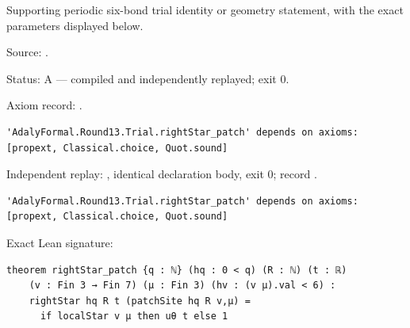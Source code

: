 \begin{theorem}[bp-399]
\label{bp-399}
\leanok
Supporting periodic six-bond trial identity or geometry statement, with the exact parameters displayed below.

\par Source: \texttt{}.
\par Status: A — compiled and independently replayed; exit 0.
\par Axiom record: \texttt{}.
\begin{verbatim}
'AdalyFormal.Round13.Trial.rightStar_patch' depends on axioms: [propext, Classical.choice, Quot.sound]
\end{verbatim}
\par Independent replay: \texttt{}, identical declaration body, exit 0; record \texttt{}.
\begin{verbatim}
'AdalyFormal.Round13.Trial.rightStar_patch' depends on axioms: [propext, Classical.choice, Quot.sound]
\end{verbatim}
\par Exact Lean signature:
\begin{verbatim}
theorem rightStar_patch {q : ℕ} (hq : 0 < q) (R : ℕ) (t : ℝ)
    (v : Fin 3 → Fin 7) (μ : Fin 3) (hv : (v μ).val < 6) :
    rightStar hq R t (patchSite hq R v,μ) =
      if localStar v μ then uθ t else 1
\end{verbatim}
\end{theorem}

